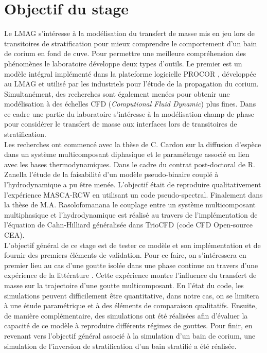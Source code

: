 \section{Objectif du stage}
Le LMAG s'intéresse à la modélisation du transfert de masse mis en jeu lors de transitoires de stratification pour mieux comprendre le comportement d'un bain de corium en fond de cuve. Pour permettre une meilleure compréhension des phénomènes le laboratoire développe deux types d'outils. Le premier est un modèle intégral implémenté dans la plateforme logicielle PROCOR \cite{le_tellier_phenomenological_2015}, développée au LMAG et utilisé par les industriels pour l’étude de la propagation du corium. Simultanément, des recherches sont également menées pour obtenir une modélisation à des échelles CFD (\textit{Computional Fluid Dynamic}) plus fines. Dans ce cadre une partie du laboratoire s'intéresse à la modélisation champ de phase pour considérer le transfert de masse aux interfaces lors de transitoires de stratification.\\ Les recherches ont commencé avec la thèse de C. Cardon \cite{cardon_modelisation_2016} sur la diffusion d'espèce dans un système multicomposant diphasique et le paramétrage associé en lien avec les bases thermodynamiques. Dans le cadre du contrat post-doctoral de R. Zanella l'étude de la faisabilité d'un modèle pseudo-binaire couplé à l'hydrodynamique a pu être menée. L'objectif était de reproduire qualitativement l'expérience MASCA-RCW \cites{zanella_two-_2020}{zanella_three-dimensional_2021} en utilisant un code pseudo-spectral. Finalement dans la thèse de M.A. Rasolofomanana \cite{rasolofomanana_modelisation_nodate} le couplage entre un système multicomposant multiphasique et l'hydrodynamique est réalisé au travers de l'implémentation de l'équation de Cahn-Hilliard généralisée dans TrioCFD  \cite{angeli_overview_2015} (code CFD Open-source CEA).\\
L'objectif général de ce stage est de tester ce modèle et son implémentation et de fournir des premiers éléments de validation. Pour ce faire, on s'intéressera en premier lieu au cas d'une goutte isolée dans une phase continue au travers d'une expérience de la littérature \cite{rao_influence_2015}. Cette expérience montre l’influence du transfert de masse sur la trajectoire d’une goutte multicomposant. En l'état du code, les simulations peuvent difficilement être quantitative, dans notre cas, on se limitera à une étude paramétrique et à des éléments de comparaison qualitatifs. Ensuite, de manière complémentaire, des simulations ont été réalisées afin d'évaluer la capacité de ce modèle à reproduire différents régimes de gouttes. Pour finir, en revenant vers l'objectif général associé à la simulation d'un bain de corium, une simulation de l'inversion de stratification d'un bain stratifié a été réalisée. \\
